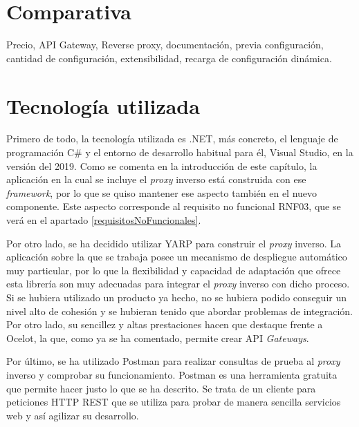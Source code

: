 \documentclass[11pt,spanish,listoffigures]{tfgetsinf}
\begin{document}

	\section{Comparativa}

Precio, API Gateway, Reverse proxy, documentación, previa configuración, cantidad de configuración, extensibilidad, recarga de configuración dinámica.


	\section{Tecnología utilizada}

Primero de todo, la tecnología utilizada es .NET, más concreto, el lenguaje de programación C\# y el entorno de desarrollo habitual para él, Visual Studio, en la versión del 2019. Como se comenta en la introducción de este capítulo, la aplicación en la cual se incluye el \emph{proxy} inverso está construida con ese \emph{framework}, por lo que se quiso mantener ese aspecto también en el nuevo componente. Este aspecto corresponde al requisito no funcional RNF03, que se verá en el apartado \ref{requisitosNoFuncionales}.

Por otro lado, se ha decidido utilizar YARP para construir el \emph{proxy} inverso. La aplicación sobre la que se trabaja posee un mecanismo de despliegue automático muy 
particular, por lo que la flexibilidad y capacidad de adaptación que ofrece esta librería son muy adecuadas para integrar el \emph{proxy} inverso con dicho proceso. Si se hubiera utilizado un producto ya hecho, no se hubiera podido conseguir un nivel alto de cohesión y se hubieran tenido que abordar problemas de integración. Por otro lado, su sencillez y altas prestaciones hacen que destaque frente a Ocelot, la que, como ya se ha comentado, permite crear API \emph{Gateways}.

Por último, se ha utilizado Postman \cite{Postman} para realizar consultas de prueba al \emph{proxy} inverso y comprobar su funcionamiento. Postman es una herramienta gratuita que permite hacer justo lo que se ha descrito. Se trata de un cliente para peticiones HTTP REST que se utiliza para probar de manera sencilla servicios web y así agilizar su desarrollo.

\end{document}
